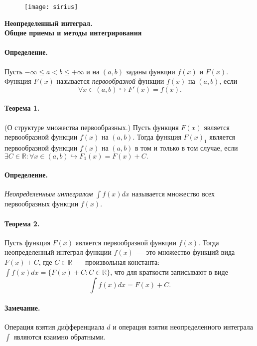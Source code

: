 \documentclass[a4paper,12pt]{article} %
\begin{document}

\begin{figure}[h!]
	\hfill
	\texttt{[image: sirius]}
\end{figure}
\vspace{5ex}
\begin{center}
	\Large\textbf{Неопределенный интеграл.\\
		Общие приемы и методы интегрирования} 
\end{center}

\paragraph*{Определение.}Пусть 
$ -\infty\leqslant a<b\leqslant+\infty $ и на $ (a, b) $
заданы функции $ f(x) $ и $ F(x) $. Функция $ F(x) $
называется \textit{первообразной} функции $ f(x) $ на 
$ (a, b) $, если
\[
	\forall x\in(a, b)\hookrightarrow F'(x)=f(x).
\] 
\paragraph{Теорема 1.}(О структуре множества первообразных.)
Пусть функция $ F(x) $ является первообразной функции 
$ f(x) $ на $ (a, b) $. Тогда функция $ F(x)_1 $ является
первообразной функции $ f(x) $ на $ (a, b) $ в том и только
в том случае, если 
$ \exists C\in\mathbb{R}: \forall x\in(a, b)
\hookrightarrow F_1(x)=F(x)+C.$
\paragraph{Определение.}\textit{Неопределенным интегралом}
$ \displaystyle\int f(x)dx $ называется множество всех первообразных 
функции $ f(x) $.
\paragraph{Теорема 2.}Пусть функция $ F(x) $ является 
первообразной функции $ f(x) $. Тогда неопределенный 
интеграл функции $ f(x) $~--- это множество функций вида
$ F(x)+C $, где $ C\in\mathbb{R} $~--- произвольная константа:
$ \int f(x)dx=\{F(x)+C:C\in\mathbb{R}\} $, что для краткости
записывают в виде
\begin{equation}
	\int f(x)dx=F(x)+C.
\end{equation}
\paragraph{Замечание.} Операция взятия дифференциала $ d $
и операция взятия неопределенного интеграла 
$ \displaystyle\int $ являются взаимно обратными.
\end{document}

